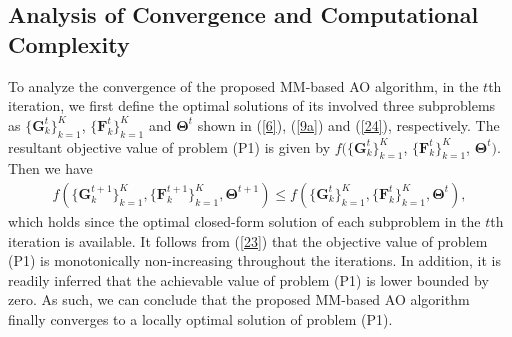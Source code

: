 \documentclass[journal]{IEEEtran}
\begin{document}
{\vspace{-3.8mm}
    
    \subsection{Analysis of Convergence and Computational Complexity}
    \vspace{-0.6mm}
To analyze the convergence of the proposed MM-based AO algorithm, in the ${t}$th iteration, we first define the optimal solutions of its involved three subproblems  as $\lbrace{\boldsymbol {G} }_{k}^{t}\rbrace_{k=1}^{K}$, $\lbrace{\boldsymbol {F} }_{k}^{t}\rbrace_{k=1}^{K}$ and ${\boldsymbol {\Theta} }^{t}$ shown in (\ref{6}), (\ref{9a}) and (\ref{24}), respectively. The resultant objective value  of problem (P1) is given by $f(\lbrace{\boldsymbol {G} }_{k}^{t}\rbrace_{k=1}^{K}$, $\lbrace{\boldsymbol {F} }_{k}^{t}\rbrace_{k=1}^{K}$, ${\boldsymbol {\Theta} }^{t})$.  Then we have 
 \begin{equation}\begin{aligned}
 f(\!\lbrace{\boldsymbol {G} }_{k}^{t\!+\!1}\!\rbrace_{k\!=\!1}^{K},\lbrace{\boldsymbol {F} }_{k}^{t\!+\!1}\rbrace_{k\!=\!1}^{K},{\boldsymbol {\Theta} }^{t\!+\!1}) \!\!\leq  \!\!f(\lbrace{\boldsymbol {G} }_{k}^{t}\rbrace_{k\!=\!1}^{K},\lbrace{\boldsymbol {F} }_{k}^{t}\rbrace_{k\!=\!1}^{K},{\boldsymbol {\Theta} }^{t}),\label{23}
  \end{aligned}\end{equation}
which holds since the optimal closed-form solution of each subproblem in the ${t}$th iteration is available. It follows  from (\ref{23}) that the objective value of problem (P1) is monotonically non-increasing throughout the iterations.
In addition,  it is readily inferred that  the achievable  value of problem (P1)  is 
lower bounded by zero. As such, we can conclude that the proposed MM-based AO algorithm finally  converges to a locally optimal solution of problem (P1)\cite{Luo}.
}
\end{document}
